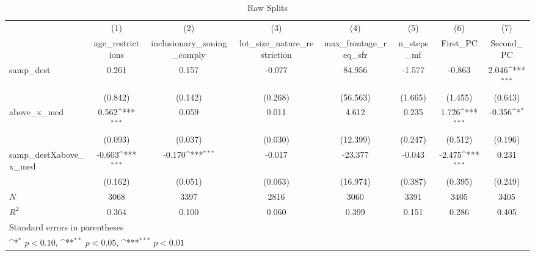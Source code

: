 \begin{table}[htbp]\centering
\def\sym#1{\ifmmode^{#1}\else\(^{#1}\)\fi}
\caption{Raw Splits}
\begin{tabular}{l*{7}{c}}
\hline\hline
            &\multicolumn{1}{c}{(1)}&\multicolumn{1}{c}{(2)}&\multicolumn{1}{c}{(3)}&\multicolumn{1}{c}{(4)}&\multicolumn{1}{c}{(5)}&\multicolumn{1}{c}{(6)}&\multicolumn{1}{c}{(7)}\\
            &\multicolumn{1}{c}{age\_restrictions}&\multicolumn{1}{c}{inclusionary\_zoning\_comply}&\multicolumn{1}{c}{lot\_size\_nature\_restriction}&\multicolumn{1}{c}{max\_frontage\_req\_sfr}&\multicolumn{1}{c}{n\_steps\_mf}&\multicolumn{1}{c}{First\_PC}&\multicolumn{1}{c}{Second\_PC}\\
\hline
samp\_dest   &       0.261         &       0.157         &      -0.077         &      84.956         &      -1.577         &      -0.863         &       2.046\sym{***}\\
            &     (0.842)         &     (0.142)         &     (0.268)         &    (56.563)         &     (1.665)         &     (1.455)         &     (0.643)         \\
[1em]
above\_x\_med &       0.562\sym{***}&       0.059         &       0.011         &       4.612         &       0.235         &       1.726\sym{***}&      -0.356\sym{*}  \\
            &     (0.093)         &     (0.037)         &     (0.030)         &    (12.399)         &     (0.247)         &     (0.512)         &     (0.196)         \\
[1em]
samp\_destXabove\_x\_med&      -0.603\sym{***}&      -0.170\sym{***}&      -0.017         &     -23.377         &      -0.043         &      -2.475\sym{***}&       0.231         \\
            &     (0.162)         &     (0.051)         &     (0.063)         &    (16.974)         &     (0.387)         &     (0.395)         &     (0.249)         \\
\hline
\(N\)       &        3068         &        3397         &        2816         &        3060         &        3391         &        3405         &        3405         \\
\(R^{2}\)   &       0.364         &       0.100         &       0.060         &       0.399         &       0.151         &       0.286         &       0.405         \\
\hline\hline
\multicolumn{8}{l}{\footnotesize Standard errors in parentheses}\\
\multicolumn{8}{l}{\footnotesize \sym{*} \(p<0.10\), \sym{**} \(p<0.05\), \sym{***} \(p<0.01\)}\\
\end{tabular}
\end{table}
